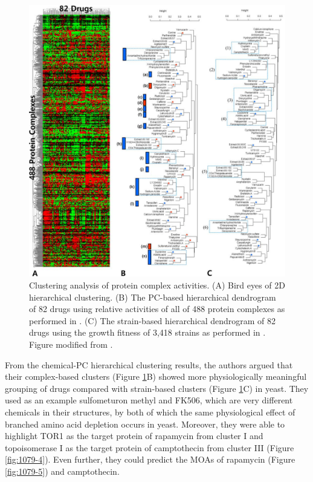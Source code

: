 \documentclass[12pt,fullpage,singlespace]{article}
\begin{document}
\begin{figure}
\centering
\includegraphics[width=\linewidth]{1079-3.png}
\caption{Clustering analysis of protein complex activities. (A) Bird eyes of 2D hierarchical clustering. (B) The PC-based hierarchical dendrogram of 82 drugs using relative activities of all of 488 protein complexes as performed in \citep{1079}. (C) The strain-based hierarchical dendrogram of 82 drugs using the growth fitness of 3,418 strains as performed in \citep{1078}. Figure modified from \citep{1079}.}
\label{fig:1079-3}
\end{figure}

From the chemical-PC hierarchical clustering results, the authors argued that their complex-based clusters (Figure \ref{fig:1079-3}B) showed more physiologically meaningful grouping of drugs compared with strain-based clusters (Figure \ref{fig:1079-3}C) in yeast. They used as an example sulfometuron methyl and FK506, which are very different chemicals in their structures, by both of which the same physiological effect of branched amino acid depletion occurs in yeast. Moreover, they were able to highlight TOR1 as the target protein of rapamycin from cluster I and topoisomerase I as the target protein of camptothecin from cluster III (Figure \ref{fig:1079-4}). Even further, they could predict the MOAs of rapamycin (Figure \ref{fig:1079-5}) and camptothecin.
\end{document}
